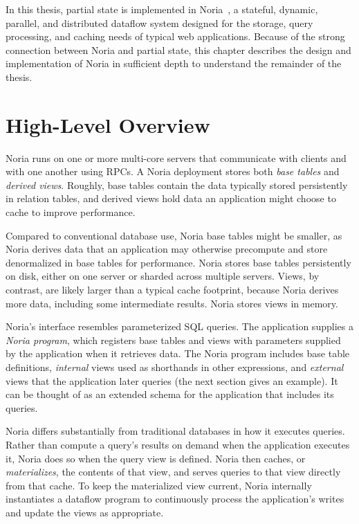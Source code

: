 In this thesis, partial state is implemented in Noria~\cite{noria}, a stateful,
dynamic, parallel, and distributed dataflow system designed for the storage,
query processing, and caching needs of typical web applications. Because of the
strong connection between Noria and partial state, this chapter describes the
design and implementation of Noria in sufficient depth to understand the
remainder of the thesis.

\section{High-Level Overview}

Noria runs on one or more multi-core servers that communicate with clients and
with one another using RPCs. A Noria deployment stores both \emph{base tables}
and \emph{derived views}. Roughly, base tables contain the data typically stored
persistently in relation tables, and derived views hold data an application
might choose to cache to improve performance.

Compared to conventional database use, Noria base tables might be smaller, as
Noria derives data that an application may otherwise precompute and store
denormalized in base tables for performance. Noria stores base tables
persistently on disk, either on one server or sharded across multiple servers.
Views, by contrast, are likely larger than a typical cache footprint, because
Noria derives more data, including some intermediate results. Noria stores views
in memory.

Noria's interface resembles parameterized SQL queries. The application supplies
a \emph{Noria program}, which registers base tables and views with parameters
supplied by the application when it retrieves data. The Noria program includes
base table definitions, \emph{internal} views used as shorthands in other
expressions, and \emph{external} views that the application later queries
(the next section gives an example). It can be thought of as an extended schema
for the application that includes its queries.

Noria differs substantially from traditional databases in how it executes
queries. Rather than compute a query's results on demand when the application
executes it, Noria does so when the query view is defined. Noria then caches, or
\emph{materializes}, the contents of that view, and serves queries to that view
directly from that cache. To keep the materialized view current, Noria
internally instantiates a dataflow program to continuously process the
application's writes and update the views as appropriate.

